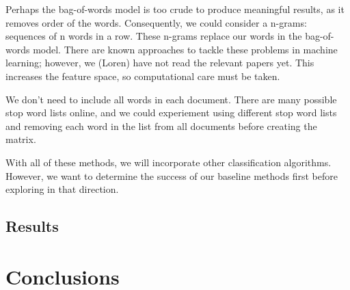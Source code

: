 \documentclass[12pt]{article}
\begin{document}
Perhaps the bag-of-words model is too crude to produce meaningful results, as it removes order of the words. Consequently, we could consider a n-grams: sequences of n words in a row. These n-grams replace our words in the bag-of-words model. There are known approaches to tackle these problems in machine learning; however, we (Loren) have not read the relevant papers yet. This increases the feature space, so computational care must be taken. 

We don't need to include all words in each document. There are many possible stop word lists online, and we could experiement using different stop word lists and removing each word in the list from all documents before creating the matrix.

With all of these methods, we will incorporate other classification algorithms. However, we want to determine the success of our baseline methods first before exploring in that direction. 

\subsection{Results}


\section{Conclusions}
\end{document}
